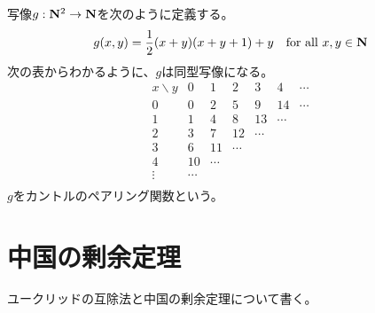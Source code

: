 	\begin{example}[カントルのペアリング関数]
	\label{eg:カントルのペアリング関数} %
		写像$g:\mathbf{N}^2\to\mathbf{N}$を次のように定義する。
		\begin{equation*}\begin{split}
			g(x, y) = \frac{1}{2}(x+y)(x+y+1) + y
			\quad\text{for all }x,y\in\mathbf{N}
		\end{split}\end{equation*}
		次の表からわかるように、$g$は同型写像になる。
		\begin{equation*}\begin{array}{c|cccccc}
			x\backslash y & 0 & 1 & 2 & 3 & 4 & \cdots \\ \hline
			0 & 0 & 2 & 5 & 9 & 14 & \cdots \\
			1 & 1 & 4 & 8 & 13 & \cdots \\
			2 & 3 & 7 & 12 & \cdots \\
			3 & 6 & 11 & \cdots \\
			4 & 10 & \cdots \\
			\vdots & \cdots \\
		\end{array}\end{equation*}
		$g$をカントルのペアリング関数という。
	\end{example} %
\section{中国の剰余定理}\label{s1:中国の剰余定理} %
	ユークリッドの互除法と中国の剰余定理について書く。

